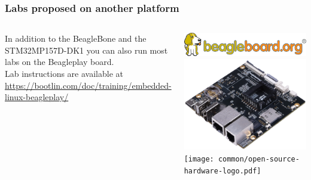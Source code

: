 \begin{frame}
\frametitle{Labs proposed on another platform}
  \begin{columns}
    In addition to the BeagleBone and the STM32MP157D-DK1 you can also run
    most labs on the Beagleplay board.\\
    \vspace{1em}
    Lab instructions are available at\\
    {\small \url{https://bootlin.com/doc/training/embedded-linux-beagleplay/}}
    \begin{center}
      \includegraphics[width=\textwidth]{../slides/beagleplay-board/beagle_logo_326x60.png}\\
      \includegraphics[width=\textwidth]{../slides/beagleplay-board/beagleplay.png}\\
      \texttt{[image: common/open-source-hardware-logo.pdf]}
    \end{center}
  \end{columns}
\end{frame}
